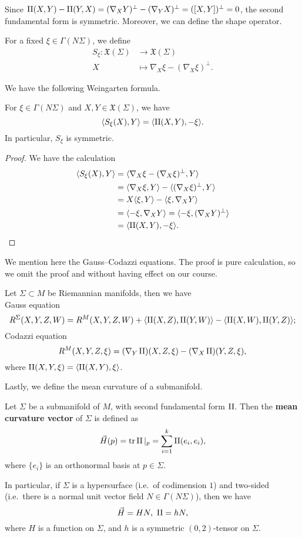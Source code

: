 Since $\operatorname{II}(X,Y)-\operatorname{II}(Y,X)=(\nabla_XY)^\perp-(\nabla_YX)^\perp=([X,Y])^\perp=0$, the second fundamental form is symmetric.
Moreover, we can define the shape operator.
\begin{defn}
    For a fixed $\xi\in\Gamma(N\Sigma)$, we define
    \begin{align*}
        S_\xi:\mathfrak{X}(\Sigma)&\to\mathfrak{X}(\Sigma)\\
        X&\mapsto\nabla_X\xi-(\nabla_X\xi)^\perp.
    \end{align*}
\end{defn}

We have the following Weingarten formula.
\begin{prop}
    For $\xi\in\Gamma(N\Sigma)$ and $X,Y\in\mathfrak{X}(\Sigma)$, we have
    \[\langle S_\xi(X),Y\rangle=\langle\operatorname{II}(X,Y),-\xi\rangle.\]
    In particular, $S_\xi$ is symmetric.
\end{prop}
\begin{proof}
    We have the calculation
    \begin{align*}
        \langle S_\xi(X),Y\rangle&=\langle\nabla_X\xi-(\nabla_X\xi)^\perp,Y\rangle\\
        &=\langle\nabla_X\xi,Y\rangle-\langle(\nabla_X\xi)^\perp,Y\rangle\\
        &=X\langle\xi,Y\rangle-\langle\xi,\nabla_XY\rangle\\
        &=\langle-\xi,\nabla_XY\rangle=\langle-\xi,(\nabla_XY)^\perp\rangle\\
        &=\langle\operatorname{II}(X,Y),-\xi\rangle.\qedhere
    \end{align*}
\end{proof}

We mention here the Gauss--Codazzi equations.
The proof is pure calculation, so we omit the proof and without having effect on our course.
\begin{thm}
    Let $\Sigma\subset M$ be Riemannian manifolds, then we have\\
    Gauss equation
    \[R^\Sigma(X,Y,Z,W)=R^M(X,Y,Z,W)+\langle\operatorname{II}(X,Z),\operatorname{II}(Y,W)\rangle-\langle\operatorname{II}(X,W),\operatorname{II}(Y,Z)\rangle;\]
    Codazzi equation
    \[R^M(X,Y,Z,\xi)=(\nabla_Y\operatorname{II})(X,Z,\xi)-(\nabla_X\operatorname{II})(Y,Z,\xi),\]
    where $\operatorname{II}(X,Y,\xi)=\langle\operatorname{II}(X,Y),\xi\rangle$.
\end{thm}

Lastly, we define the mean curvature of a submanifold.
\begin{defn}
    Let $\Sigma$ be a submanifold of $M$, with second fundamental form $\operatorname{II}$.
    Then the \textbf{mean curvature vector} of $\Sigma$ is defined as
    \[\vec{H}(p)=\operatorname{tr}\operatorname{II}|_p=\sum_{i=1}^k\operatorname{II}(e_i,e_i),\]
    where $\{e_i\}$ is an orthonormal basis at $p\in\Sigma$.

    In particular, if $\Sigma$ is a hypersurface (i.e.\ of codimension $1$) and two-sided (i.e.\ there is a normal unit vector field $N\in\Gamma(N\Sigma)$), then we have
    \[\vec{H}=HN,\ \operatorname{II}=hN,\]
    where $H$ is a function on $\Sigma$, and $h$ is a symmetric $(0,2)$-tensor on $\Sigma$.
\end{defn}

